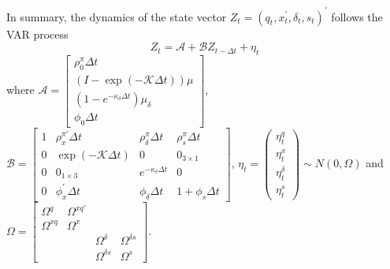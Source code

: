 \documentclass{article}
\begin{document}
In summary, the dynamics of the state vector $Z_{t}=\left(
q_{t},x_{t}^{\prime },\delta _{t},s_{t}\right) ^{\prime }$ follows the VAR
process%
\begin{equation*}
Z_{t}=\mathcal{A}+\mathcal{B}Z_{t-\Delta t}+\eta _{t}
\end{equation*}%
where $\mathcal{A}=\left[ 
\begin{array}{c}
\rho _{0}^{\pi }\Delta t \\ 
\left( I-\exp \left( -\mathcal{K}\Delta t\right) \right) \mu  \\ 
\left( 1-e^{-\kappa _{\delta }\Delta t}\right) \mu _{\delta } \\ 
\phi _{0}\Delta t%
\end{array}%
\right] $, $\mathcal{B}=%
\begin{bmatrix}
1 & \rho _{x}^{\pi \prime }\Delta t & \rho _{\delta }^{\pi }\Delta t & \rho
_{s}^{\pi }\Delta t \\ 
0 & \exp \left( -\mathcal{K}\Delta t\right)  & 0 & 0_{3\times 1} \\ 
0 & 0_{1\times 3} & e^{-\kappa _{\delta }\Delta t} & 0 \\ 
0 & \phi _{x}^{\prime }\Delta t & \phi _{\delta }\Delta t & 1+\phi
_{s}\Delta t%
\end{bmatrix}%
$, $\eta _{t}=\left( 
\begin{array}{c}
\eta _{t}^{q} \\ 
\eta _{t}^{x} \\ 
\eta _{t}^{\delta } \\ 
\eta _{t}^{s}%
\end{array}%
\right) \sim N\left( 0,\Omega \right) $ and $\Omega =%
\begin{bmatrix}
\Omega ^{q} & \Omega ^{xq\prime } &  &  \\ 
\Omega ^{xq} & \Omega ^{x} &  &  \\ 
&  & \Omega ^{\delta } & \Omega ^{\delta s} \\ 
&  & \Omega ^{\delta s} & \Omega ^{s}%
\end{bmatrix}%
$.
\end{document}
